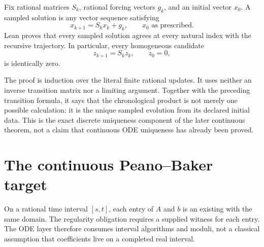 \begin{theorem}
\label{thm:sampled-linear-uniqueness}
\leanok
Fix rational matrices \(S_k\), rational forcing vectors \(g_k\), and an
initial vector \(x_0\).  A sampled solution is any vector sequence satisfying
\[
  x_{k+1}=S_kx_k+g_k,\qquad x_0\text{ as prescribed}.
\]
Lean proves that every sampled solution agrees at every natural index with
the recursive trajectory.  In particular, every homogeneous candidate
\[
  z_{k+1}=S_kz_k,\qquad z_0=0,
\]
is identically zero.

The proof is induction over the literal finite rational updates.  It uses
neither an inverse transition matrix nor a limiting argument.  Together with
the preceding transition formula, it says that the chronological product is
not merely one possible calculation: it is the unique sampled evolution from
its declared initial data.  This is the exact discrete uniqueness component of
the later continuous theorem, not a claim that continuous ODE uniqueness has
already been proved.
\end{theorem}

\section{The continuous Peano--Baker target}

\begin{definition}
\label{def:interval-linear-system}
\leanok
On a rational time interval \([s,t]\), each entry of \(A\) and \(b\) is an
existing  with the same domain. The regularity
obligation requires a supplied  witness for each
entry. The ODE layer therefore consumes interval algorithms and moduli, not a
classical assumption that coefficients live on a completed real interval.
\end{definition}

